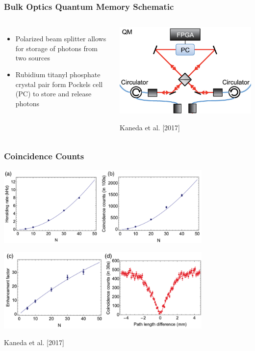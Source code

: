 \documentclass{beamer}
\begin{document}
\begin{frame}\frametitle{Bulk Optics Quantum Memory Schematic}
    \begin{columns}
        \begin{itemize}
            \item Polarized beam splitter allows for storage of photons from two sources
            \item Rubidium titanyl phosphate crystal pair form Pockels cell (PC) to store and release photons
        \end{itemize}

    \begin{center}
    \includegraphics[width=1.0\textwidth]{Images/QMSchem.jpg}

    \tiny{Kaneda et al. [2017]}
    \end{center}
    \end{columns}
\end{frame}

\begin{frame}\frametitle{Coincidence Counts}
    \centering
    \includegraphics[width=0.8\textwidth]{Images/Figure3a.jpg}

    \includegraphics[width=0.8\textwidth]{Images/Figure3b.jpg}

    \tiny{Kaneda et al. [2017]}
\end{frame}
\end{document}

